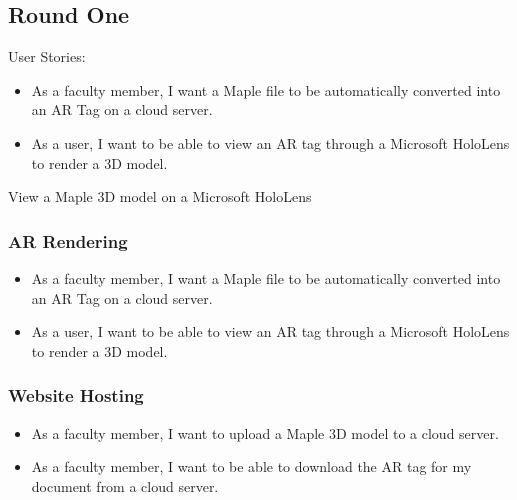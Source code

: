 

\subsection{Round One}

User Stories:

\begin{itemize}
	\item As a faculty member, I want a Maple file to be automatically converted into an AR Tag on a cloud server.
	\item As a user, I want to be able to view an AR tag through a Microsoft HoloLens to render a 3D model.
\end{itemize}

View a Maple 3D model on a Microsoft HoloLens

\subsubsection{AR Rendering}

\begin{itemize}
	\item As a faculty member, I want a Maple file to be automatically converted into an AR Tag on a cloud server.
	\item As a user, I want to be able to view an AR tag through a Microsoft HoloLens to render a 3D model.
\end{itemize}

\subsubsection{Website Hosting}

\begin{itemize}
	\item As a faculty member, I want to upload a Maple 3D model to a cloud server.
	\item As a faculty member, I want to be able to download the AR tag for my document from a cloud server.
\end{itemize}

